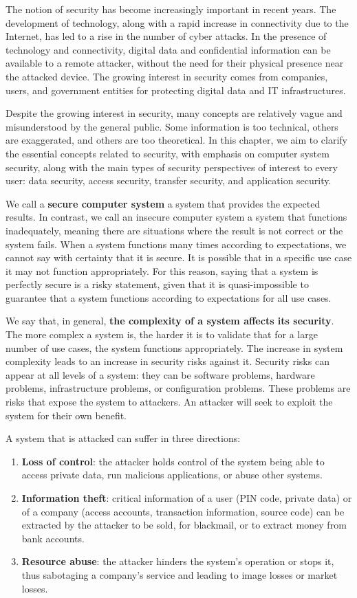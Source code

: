 The notion of security has become increasingly important in recent years.
The development of technology, along with a rapid increase in connectivity due to the Internet, has led to a rise in the number of cyber attacks.
In the presence of technology and connectivity, digital data and confidential information can be available to a remote attacker, without the need for their physical presence near the attacked device.
The growing interest in security comes from companies, users, and government entities for protecting digital data and IT infrastructures.

Despite the growing interest in security, many concepts are relatively vague and misunderstood by the general public.
Some information is too technical, others are exaggerated, and others are too theoretical.
In this chapter, we aim to clarify the essential concepts related to security, with emphasis on computer system security, along with the main types of security perspectives of interest to every user: data security, access security, transfer security, and application security.

We call a \textbf{secure computer system} a system that provides the expected results.
In contrast, we call an insecure computer system a system that functions inadequately, meaning there are situations where the result is not correct or the system fails.
When a system functions many times according to expectations, we cannot say with certainty that it is secure.
It is possible that in a specific use case it may not function appropriately.
For this reason, saying that a system is perfectly secure is a risky statement, given that it is quasi-impossible to guarantee that a system functions according to expectations for all use cases.

We say that, in general, \textbf{the complexity of a system affects its security}.
The more complex a system is, the harder it is to validate that for a large number of use cases, the system functions appropriately.
The increase in system complexity leads to an increase in security risks against it.
Security risks can appear at all levels of a system: they can be software problems, hardware problems, infrastructure problems, or configuration problems.
These problems are risks that expose the system to attackers.
An attacker will seek to exploit the system for their own benefit.

A system that is attacked can suffer in three directions:
\begin{enumerate}
  \item \textbf{Loss of control}: the attacker holds control of the system being able to access private data, run malicious applications, or abuse other systems.
  \item \textbf{Information theft}: critical information of a user (PIN code, private data) or of a company (access accounts, transaction information, source code) can be extracted by the attacker to be sold, for blackmail, or to extract money from bank accounts.
  \item \textbf{Resource abuse}: the attacker hinders the system's operation or stops it, thus sabotaging a company's service and leading to image losses or market losses.
\end{enumerate}

